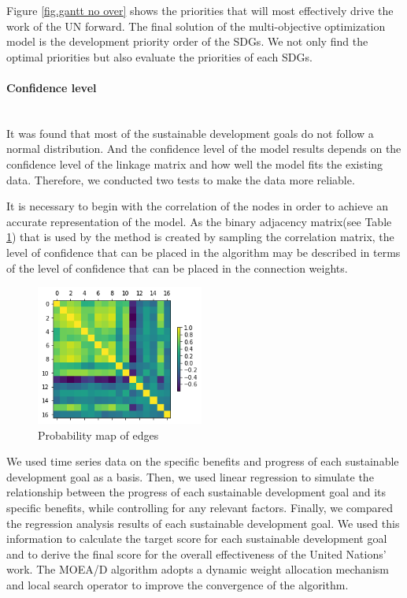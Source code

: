 \documentclass[10pt]{mcmthesis}
\newcommand{\subsubsubsection}[1]{\paragraph{#1}\mbox{}\\}
\begin{document}
Figure \ref{fig.gantt no over}  shows the priorities that will most effectively drive the work of the UN forward. The final solution of the multi-objective optimization model is the development priority order of the SDGs. We not only find the optimal priorities but also evaluate the priorities of each SDGs.

\subsubsubsection{Confidence level}

 It was found that most of the sustainable development goals do not follow a normal distribution. And the confidence level of the model results depends on the confidence level of the linkage matrix and how well the model fits the existing data. Therefore, we conducted two tests to make the data more reliable.

It is necessary to begin with the correlation of the nodes in order to achieve an accurate representation of the model. As the binary adjacency matrix(see Table \ref{fig.prob}) that is used by the method is created by sampling the correlation matrix, the level of confidence that can be placed in the algorithm may be described in terms of the level of confidence that can be placed in the connection weights. 


\begin{figure}[H]
    \centering
    \includegraphics[width=5.5cm]{figures/prob.png}
    \caption{ Probability map of edges }%
    \label{fig.prob}
\end{figure} 

We used time series data on the specific benefits and progress of each sustainable development goal as a basis. Then, we used linear regression to simulate the relationship between the progress of each sustainable development goal and its specific benefits, while controlling for any relevant factors. Finally, we compared the regression analysis results of each sustainable development goal. We used this information to calculate the target score for each sustainable development goal and to derive the final score for the overall effectiveness of the United Nations’ work. 
The MOEA/D algorithm adopts a dynamic weight allocation mechanism and local search operator to improve the convergence of the algorithm.
\end{document}
